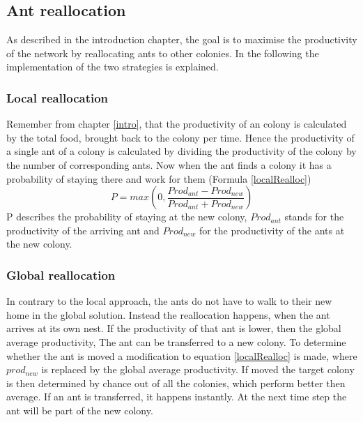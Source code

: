 \subsection{Ant reallocation}
As described in the introduction chapter, the goal is to maximise the productivity of the network by reallocating ants to other colonies. In the following the implementation of the two strategies is explained.
\subsubsection{Local reallocation}
Remember from chapter \ref{intro}, that the productivity of an colony is calculated by the total food, brought back to the colony per time. Hence the productivity of a single ant of a colony is calculated by dividing the productivity of the colony by the number of corresponding ants. Now when the ant finds a colony it has a probability of staying there and work for them (Formula \ref{localRealloc})
\begin{equation} \label{localRealloc}
P = max(0,\frac{Prod_{ant}-Prod_{new}}{Prod_{ant}+Prod_{new}})
\end{equation}
P describes the probability of staying at the new colony, $Prod_{ant}$ stands for the productivity of the arriving ant and $Prod_{new}$ for the productivity of the ants at the new colony.
\subsubsection{Global reallocation}
In contrary to the local approach, the ants do not have to walk to their new home in the global solution. Instead the reallocation happens, when the ant arrives at its own nest. If the productivity of that ant is lower, then the global average productivity, The ant can be transferred to a new colony. To determine whether the ant is moved a modification to equation \ref{localRealloc} is made, where $prod_{new}$ is replaced by the global average productivity. If moved the target colony is then determined by chance out of all the colonies, which perform better then average.
If an ant is transferred, it happens instantly. At the next time step the ant will be part of the new colony.